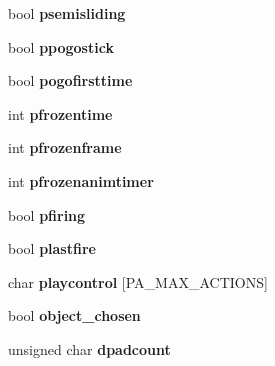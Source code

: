 \begin{DoxyCompactItemize}
\item 
\hypertarget{class_c_player_aff7e771973f97115662d91088f3a52f4}{
bool {\bfseries psemisliding}}
\label{class_c_player_aff7e771973f97115662d91088f3a52f4}

\item 
\hypertarget{class_c_player_a180ebfeede5a5dd94724c29b6f63e720}{
bool {\bfseries ppogostick}}
\label{class_c_player_a180ebfeede5a5dd94724c29b6f63e720}

\item 
\hypertarget{class_c_player_adea05680a34d1c6984dc6f4848d025ec}{
bool {\bfseries pogofirsttime}}
\label{class_c_player_adea05680a34d1c6984dc6f4848d025ec}

\item 
\hypertarget{class_c_player_a3e4b0a93f0ad594c092ff0e7e08176e3}{
int {\bfseries pfrozentime}}
\label{class_c_player_a3e4b0a93f0ad594c092ff0e7e08176e3}

\item 
\hypertarget{class_c_player_aceef755ed2c8054efca6d910651712dc}{
int {\bfseries pfrozenframe}}
\label{class_c_player_aceef755ed2c8054efca6d910651712dc}

\item 
\hypertarget{class_c_player_a960f9fd018071a56fed87b62d7c6340b}{
int {\bfseries pfrozenanimtimer}}
\label{class_c_player_a960f9fd018071a56fed87b62d7c6340b}

\item 
\hypertarget{class_c_player_aa2cae2198b29944729bd100636d7d210}{
bool {\bfseries pfiring}}
\label{class_c_player_aa2cae2198b29944729bd100636d7d210}

\item 
\hypertarget{class_c_player_a8d3fcbbbd46efc5a1a1506f1b92c9479}{
bool {\bfseries plastfire}}
\label{class_c_player_a8d3fcbbbd46efc5a1a1506f1b92c9479}

\item 
\hypertarget{class_c_player_abc3172c28758d41edd09a5aa514cf588}{
char {\bfseries playcontrol} \mbox{[}PA\_\-MAX\_\-ACTIONS\mbox{]}}
\label{class_c_player_abc3172c28758d41edd09a5aa514cf588}

\item 
\hypertarget{class_c_player_aa10aff3767b92c7feed52895e3a27b38}{
bool {\bfseries object\_\-chosen}}
\label{class_c_player_aa10aff3767b92c7feed52895e3a27b38}

\item 
\hypertarget{class_c_player_a14cdc686726c4894362e14cd6ac620bd}{
unsigned char {\bfseries dpadcount}}
\label{class_c_player_a14cdc686726c4894362e14cd6ac620bd}


\end{DoxyCompactItemize}
